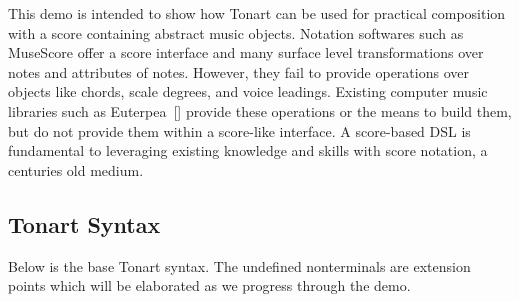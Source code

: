 \documentclass[10pt, sigplan]{acmart}
\let\Footnote\undefined
\newcommand{\textsuper}[1]{$^{\hbox{\textsmaller{#1}}}$}
\let\SOriginalthesubsubsection\thesubsubsection
\newcommand{\Ssubsection}[2]{\subsection[#1]{#2}\let\thesubsubsection\SOriginalthesubsubsection}
\newcommand{\AutobibLink}[1]{\color{ACMPurple}{#1}}
\newcommand{\Footnote}[1]{\footnote{#1}}
\newcommand{\FootnoteRef}[1]{}
\newcommand{\FootnoteTarget}[1]{}
\newcommand{\FootnoteContent}[1]{#1}
\newenvironment{FootnoteBlock}{\renewcommand{\noindent}{}}{}
\newcommand{\FootnoteBlockContent}[1]{}
\newcommand{\Autobibref}[1]{#1}
\providecommand{\AutobibLink}[1]{#1}
\begin{document}
This demo is intended to show how Tonart can be used for practical composition
with a score containing abstract music objects.  Notation softwares such as
MuseScore\Footnote{\FootnoteRef{\textsuper{\hyperref[t:x28x7ccounterx2dx28x29x7c_x23x28structx3ageneratedx2dtagx29x29]{1}}}\FootnoteContent{https://musescore.org/en}} offer a score interface and
many surface level transformations over notes and attributes of notes.  However,
they fail to provide operations over objects like chords, scale degrees, and
voice leadings.  Existing computer music libraries such as
Euterpea\Autobibref{~[\hyperref[t:x28autobib_x22Px2e_HudakEuterpea2014httpx3ax2fx2feuterpeax2ecomx22x29]{\AutobibLink{1}}]} provide these operations or the means to build
them, but do not provide them within a score{-}like interface.  A score{-}based DSL
is fundamental to leveraging existing knowledge and skills with score notation,
a centuries old medium.\label{t:x28part_x28gentag_0x29x29}

\begin{FootnoteBlock}\FootnoteBlockContent{\FootnoteTarget{\textsuper{\label{t:x28x7ccounterx2dx28x29x7c_x28gentag_1x29x29}\textsf{1}}}https://musescore.org/en}\end{FootnoteBlock}

\Ssubsection{Tonart Syntax}{Tonart Syntax}\label{t:x28part_x22Tonartx5fSyntaxx22x29}

Below is the base Tonart syntax.  The undefined nonterminals are extension points which will be
elaborated as we progress through the demo.
\hspace*{\fill}\\


\noindent 
\end{document}
